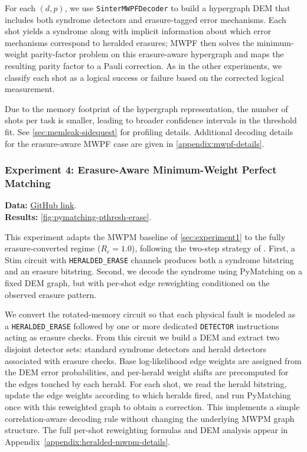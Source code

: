\documentclass[11pt, notitlepage, letterpaper]{article}
\begin{document}
For each $(d,p)$, we use \texttt{SinterMWPFDecoder} to build a hypergraph DEM that includes both syndrome detectors and erasure-tagged error mechanisms. Each shot yields a syndrome along with implicit information about which error mechanisms correspond to heralded erasures; MWPF then solves the minimum-weight parity-factor problem on this erasure-aware hypergraph and maps the resulting parity factor to a Pauli correction. As in the other experiments, we classify each shot as a logical success or failure based on the corrected logical measurement.

Due to the memory footprint of the hypergraph representation, the number of shots per task is smaller, leading to broader confidence intervals in the threshold fit. See \autoref{sec:memleak-sidequest} for profiling details. Additional decoding details for the erasure-aware MWPF case are given in \autoref{appendix:mwpf-details}.

\subsubsection{Experiment 4: Erasure-Aware Minimum-Weight Perfect Matching}\label{sec:experiment4}

\textbf{Data:}
\href{https://github.com/leigh-johnson/C191A-qubit-minesweeper/tree/main/datasets/circuit%3Dsurface_code%3Arotated_memory_x/decoder%3DHeraldedEraseDecoder/erasure%3D1.0}{GitHub link}.\\
\textbf{Results:} \autoref{fig:pymatching-pthresh-erase}.

This experiment adapts the MWPM baseline of \autoref{sec:experiment1} to the fully erasure-converted regime ($R_e = 1.0$), following the two-step strategy of \citeauthor{gu_fault-tolerant_2025}. First, a Stim circuit with \texttt{HERALDED\_ERASE} channels produces both a syndrome bitstring and an erasure bitstring. Second, we decode the syndrome using PyMatching on a fixed DEM graph, but with per-shot edge reweighting conditioned on the observed erasure pattern.

We convert the rotated-memory circuit so that each physical fault is modeled as a \texttt{HERALDED\_ERASE} followed by one or more dedicated \texttt{DETECTOR} instructions acting as erasure checks. From this circuit we build a DEM and extract two disjoint detector sets: standard syndrome detectors and herald detectors associated with erasure checks. Base log-likelihood edge weights are assigned from the DEM error probabilities, and per-herald weight shifts are precomputed for the edges touched by each herald. For each shot, we read the herald bitstring, update the edge weights according to which heralds fired, and run PyMatching once with this reweighted graph to obtain a correction. This implements a simple correlation-aware decoding rule without changing the underlying MWPM graph structure. The full per-shot reweighting formulas and DEM analysis appear in Appendix~\ref{appendix:heralded-mwpm-details}.
\end{document}
